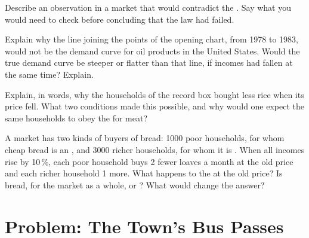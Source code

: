 \begin{exercise}[$\star\star\star$]\label{exo:g10:demand:12}
Describe an observation in a market that would contradict the . Say what you would need to check before
concluding that the law had failed.
\end{exercise}

\begin{exercise}[$\star\star\star$]\label{exo:g10:demand:13}
Explain why the line joining the points of the opening chart, from 1978 to 1983, would not be the demand curve for oil
products in the United States. Would the true demand curve be steeper or flatter than that line, if incomes had fallen at
the same time? Explain.
\end{exercise}

\begin{exercise}[$\star\star\star$]\label{exo:g10:demand:14}
Explain, in words, why the households of the record box bought less rice when its price fell. What two conditions made this
possible, and why would one expect the same households to obey the  for meat?
\end{exercise}

\begin{exercise}[$\star\star\star$]\label{exo:g10:demand:15}
A market has two kinds of buyers of bread: \num{1000} poor households, for whom cheap bread is an , and \num{3000}
richer households, for whom it is . When all incomes rise by 10\,\%, each poor household buys 2 fewer loaves a month at
the old price and each richer household 1 more. What happens to the  at the old price? Is bread, for the market as
a whole,  or ? What would change the answer?
\end{exercise}

\section{Problem: The Town's Bus Passes}

